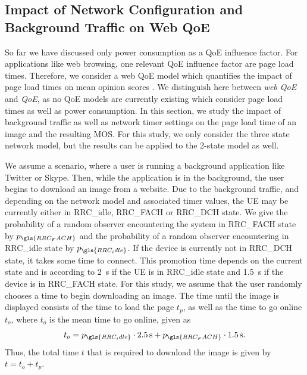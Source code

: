 \subsection{Impact of Network Configuration and Background Traffic on Web QoE}\label{sec:network:network_traces:numerical_results:web_qoe}
So far we have discussed only power consumption as a \gls{QoE} influence factor.
For applications like web browsing, one relevant QoE influence factor are page load times.
Therefore, we consider a web QoE model which quantifies the impact of page load times on mean opinion scores \cite{egger2012a}.
We distinguish here between \emph{web \gls{QoE}} and \emph{\gls{QoE}}, as no \gls{QoE} models are currently existing which consider page load times as well as power consumption.
In this section, we study the impact of background traffic as well as network timer settings on the page load time of an image and the resulting \gls{MOS}.
For this study, we only consider the three state network model, but the results can be applied to the 2-state model as well.

We assume a scenario, where a user is running a background application like Twitter or Skype.
Then, while the application is in the background, the user begins to download an image from a website.
Due to the background traffic, and depending on the network model and associated timer values, the \gls{UE} may be currently either in \gls{RRC_idle}, \gls{RRC_FACH} or \gls{RRC_DCH} state.
We give the probability of a random observer encountering the system in \gls{RRC_FACH} state by \(p_{\gls{RRC_FACH}}\) and the probability of a random observer encountering in \gls{RRC_idle} state by $p_{\gls{RRC_idle}}$.
If the device is currently not in \gls{RRC_DCH} state, it takes some time to connect.
This promotion time depends on the current state and is according to \cite{Qian2010b} \SI{2}{\second} if the \gls{UE} is in \gls{RRC_idle} state and \SI{1.5}{\second} if the device is in \gls{RRC_FACH} state.
For this study, we assume that the user randomly chooses a time to begin downloading an image.
The time until the image is displayed consists of the time to load the page \(t_p\), as well as the time to go online \(t_o\), where \(t_o\) is the mean time to go online, given as 
\[t_o = p_{\gls{RRC_idle}} \cdot \SI{2.5}{\second} + p_{\gls{RRC_FACH}} \cdot \SI{1.5}{\second}.\]
Thus, the total time \(t\) that is required to download the image is given by \(t = t_o + t_p\).

